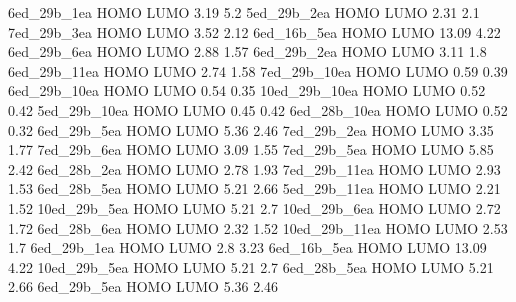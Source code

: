 6ed_29b_1ea
HOMO  LUMO
3.19 5.2
5ed_29b_2ea
HOMO  LUMO
2.31 2.1
7ed_29b_3ea
HOMO  LUMO
3.52 2.12
6ed_16b_5ea
HOMO  LUMO
13.09 4.22
6ed_29b_6ea
HOMO  LUMO
2.88 1.57
6ed_29b_2ea
HOMO  LUMO
3.11 1.8
6ed_29b_11ea
HOMO  LUMO
2.74 1.58
7ed_29b_10ea
HOMO  LUMO
0.59 0.39
6ed_29b_10ea
HOMO  LUMO
0.54 0.35
10ed_29b_10ea
HOMO  LUMO
0.52 0.42
5ed_29b_10ea
HOMO  LUMO
0.45 0.42
6ed_28b_10ea
HOMO  LUMO
0.52 0.32
6ed_29b_5ea
HOMO  LUMO
5.36 2.46
7ed_29b_2ea
HOMO  LUMO
3.35 1.77
7ed_29b_6ea
HOMO  LUMO
3.09 1.55
7ed_29b_5ea
HOMO  LUMO
5.85 2.42
6ed_28b_2ea
HOMO  LUMO
2.78 1.93
7ed_29b_11ea
HOMO  LUMO
2.93 1.53
6ed_28b_5ea
HOMO  LUMO
5.21 2.66
5ed_29b_11ea
HOMO  LUMO
2.21 1.52
10ed_29b_5ea
HOMO  LUMO
5.21 2.7
10ed_29b_6ea
HOMO  LUMO
2.72 1.72
6ed_28b_6ea
HOMO  LUMO
2.32 1.52
10ed_29b_11ea
HOMO  LUMO
2.53 1.7
6ed_29b_1ea
HOMO  LUMO
2.8 3.23
6ed_16b_5ea
HOMO  LUMO
13.09 4.22
10ed_29b_5ea
HOMO  LUMO
5.21 2.7
6ed_28b_5ea
HOMO  LUMO
5.21 2.66
6ed_29b_5ea
HOMO  LUMO
5.36 2.46

